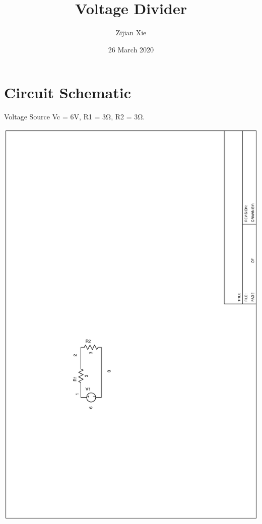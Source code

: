 \documentclass{article}
\title{Voltage Divider}
\author{Zijian Xie}
\date{26 March 2020}
\begin{document}
\maketitle

\section{Circuit Schematic}
Voltage Source Vc = 6V, R1 = 3Ω, R2 = 3Ω.

\includegraphics[width=\textwidth, angle=-90]{01.ps}
\end{document}
